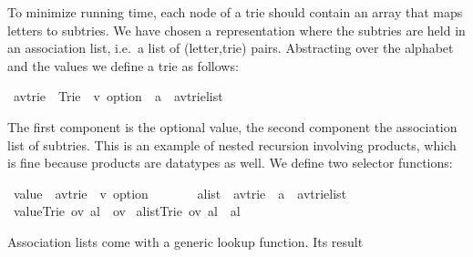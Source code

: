 %
\begin{isabellebody}%
\def\isabellecontext{Trie}%
\isamarkupfalse%
%
\begin{isamarkuptext}%
To minimize running time, each node of a trie should contain an array that maps
letters to subtries. We have chosen a
representation where the subtries are held in an association list, i.e.\ a
list of (letter,trie) pairs.  Abstracting over the alphabet  and the
values  we define a trie as follows:%
\end{isamarkuptext}%
\isamarkuptrue%
\ {\isacharparenleft}{\isacharprime}a{\isacharcomma}{\isacharprime}v{\isacharparenright}trie\ {\isacharequal}\ Trie\ \ {\isachardoublequote}{\isacharprime}v\ option{\isachardoublequote}\ \ {\isachardoublequote}{\isacharparenleft}{\isacharprime}a\ {\isacharasterisk}\ {\isacharparenleft}{\isacharprime}a{\isacharcomma}{\isacharprime}v{\isacharparenright}trie{\isacharparenright}list{\isachardoublequote}\isamarkupfalse%
%
\begin{isamarkuptext}%
\noindent
{}%
The first component is the optional value, the second component the
association list of subtries.  This is an example of nested recursion involving products,
which is fine because products are datatypes as well.
We define two selector functions:%
\end{isamarkuptext}%
\isamarkuptrue%
\ value\ {\isacharcolon}{\isacharcolon}\ {\isachardoublequote}{\isacharparenleft}{\isacharprime}a{\isacharcomma}{\isacharprime}v{\isacharparenright}trie\ {\isasymRightarrow}\ {\isacharprime}v\ option{\isachardoublequote}\isanewline
\ \ \ \ \ \ \ alist\ {\isacharcolon}{\isacharcolon}\ {\isachardoublequote}{\isacharparenleft}{\isacharprime}a{\isacharcomma}{\isacharprime}v{\isacharparenright}trie\ {\isasymRightarrow}\ {\isacharparenleft}{\isacharprime}a\ {\isacharasterisk}\ {\isacharparenleft}{\isacharprime}a{\isacharcomma}{\isacharprime}v{\isacharparenright}trie{\isacharparenright}list{\isachardoublequote}\isanewline
\isamarkupfalse%
\ {\isachardoublequote}value{\isacharparenleft}Trie\ ov\ al{\isacharparenright}\ {\isacharequal}\ ov{\isachardoublequote}\isanewline
\isamarkupfalse%
\ {\isachardoublequote}alist{\isacharparenleft}Trie\ ov\ al{\isacharparenright}\ {\isacharequal}\ al{\isachardoublequote}\isamarkupfalse%
%
\begin{isamarkuptext}%
\noindent
Association lists come with a generic lookup function.  Its result

\end{isamarkuptext}
\end{isabellebody}
